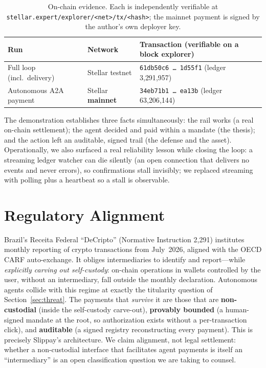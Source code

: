 \documentclass[11pt]{article}
\begin{document}
\begin{table}[h]
\centering
\small
\begin{tabular}{@{}lll@{}}
\toprule
\textbf{Run} & \textbf{Network} & \textbf{Transaction (verifiable on a block explorer)} \\
\midrule
Full loop (incl.\ delivery) & Stellar testnet & \texttt{61db50c6\,\ldots\,1d55f1} (ledger 3{,}291{,}957) \\
Autonomous A2A payment & Stellar \textbf{mainnet} & \texttt{34eb71b1\,\ldots\,ea13b} (ledger 63{,}206{,}144) \\
\bottomrule
\end{tabular}
\caption{On-chain evidence. Each is independently verifiable at
\texttt{stellar.expert/explorer/<net>/tx/<hash>}; the mainnet payment is signed by the author's
own deployer key.}
\end{table}

The demonstration establishes three facts simultaneously: the rail works (a real on-chain
settlement); the agent decided and paid within a mandate (the thesis); and the action left an
auditable, signed trail (the defense and the asset). Operationally, we also surfaced a real
reliability lesson while closing the loop: a streaming ledger watcher can die silently (an open
connection that delivers no events and never errors), so confirmations stall invisibly; we
replaced streaming with polling plus a heartbeat so a stall is observable.

\section{Regulatory Alignment}
\label{sec:reg}

Brazil's Receita Federal ``DeCripto'' (Normative Instruction 2{,}291) institutes monthly
reporting of crypto transactions from July~2026, aligned with the OECD CARF auto-exchange. It
obliges intermediaries to identify and report---while \emph{explicitly carving out self-custody}:
on-chain operations in wallets controlled by the user, without an intermediary, fall outside the
monthly declaration. Autonomous agents collide with this regime at exactly the titularity
question of Section~\ref{sec:threat}. The payments that \emph{survive} it are those that are
\textbf{non-custodial} (inside the self-custody carve-out), \textbf{provably bounded} (a
human-signed mandate at the root, so authorization exists without a per-transaction click), and
\textbf{auditable} (a signed registry reconstructing every payment). This is precisely Slippay's
architecture. We claim alignment, not legal settlement: whether a non-custodial interface that
facilitates agent payments is itself an ``intermediary'' is an open classification question we
are taking to counsel.
\end{document}
